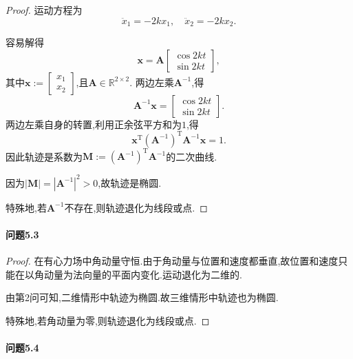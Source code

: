 \documentclass{article}
\newcommand{\nstars}[1]{\multido{}{#1}{$\star$}}
\begin{document}
\begin{proof}

运动方程为
$$\ddot x_1=-2kx_1,\quad\ddot x_2=-2kx_2.$$

容易解得
$$\mathbf x=\mathbf A\left[\begin{matrix}\cos2kt\\\sin2kt\end{matrix}\right],$$
其中$\mathbf x:=\left[\begin{matrix}x_1\\x_2\end{matrix}\right]$,且$\mathbf A\in\mathbb R^{2\times2}$.
两边左乘$\mathbf A^{-1}$,得
$$\mathbf A^{-1}\mathbf x=\left[\begin{matrix}\cos2kt\\\sin2kt\end{matrix}\right].$$
两边左乘自身的转置,利用正余弦平方和为$1$,得
$$\mathbf x^{\mathrm T}\left(\mathbf A^{-1}\right)^\mathrm T\mathbf A^{-1}\mathbf x=1.$$
因此轨迹是系数为$\mathbf M:=\left(\mathbf A^{-1}\right)^\mathrm T\mathbf A^{-1}$的二次曲线.

因为$\left|\mathbf M\right|=\left|\mathbf A^{-1}\right|^2>0$,故轨迹是椭圆.

特殊地,若$\mathbf A^{-1}$不存在,则轨迹退化为线段或点.

\end{proof}

\paragraph{问题5.3}\nstars{1}

\begin{proof}

在有心力场中角动量守恒.由于角动量与位置和速度都垂直,故位置和速度只能在以角动量为法向量的平面内变化.运动退化为二维的.

由第2问可知,二维情形中轨迹为椭圆.故三维情形中轨迹也为椭圆.

特殊地,若角动量为零,则轨迹退化为线段或点.

\end{proof}

\paragraph{问题5.4}\nstars{3}
\end{document}

